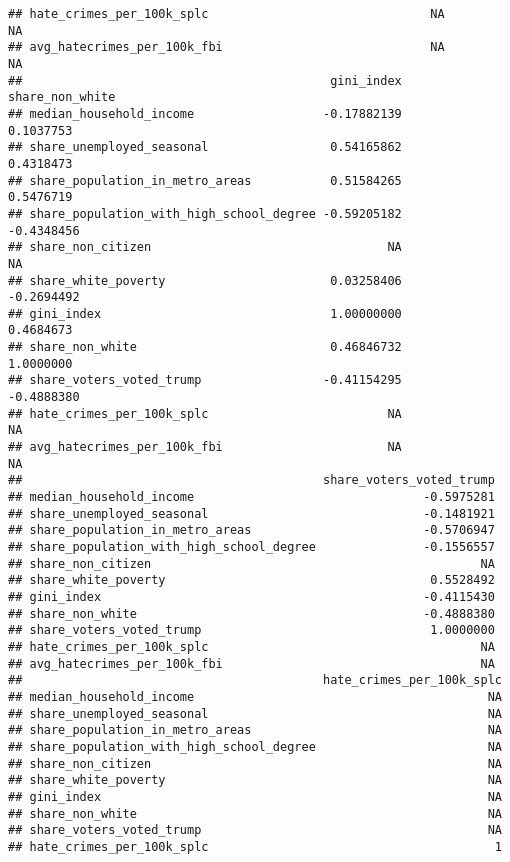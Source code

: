 \documentclass[
]{article}
\begin{document}
\begin{verbatim}
## hate_crimes_per_100k_splc                               NA                  NA
## avg_hatecrimes_per_100k_fbi                             NA                  NA
##                                           gini_index share_non_white
## median_household_income                  -0.17882139       0.1037753
## share_unemployed_seasonal                 0.54165862       0.4318473
## share_population_in_metro_areas           0.51584265       0.5476719
## share_population_with_high_school_degree -0.59205182      -0.4348456
## share_non_citizen                                 NA              NA
## share_white_poverty                       0.03258406      -0.2694492
## gini_index                                1.00000000       0.4684673
## share_non_white                           0.46846732       1.0000000
## share_voters_voted_trump                 -0.41154295      -0.4888380
## hate_crimes_per_100k_splc                         NA              NA
## avg_hatecrimes_per_100k_fbi                       NA              NA
##                                          share_voters_voted_trump
## median_household_income                                -0.5975281
## share_unemployed_seasonal                              -0.1481921
## share_population_in_metro_areas                        -0.5706947
## share_population_with_high_school_degree               -0.1556557
## share_non_citizen                                              NA
## share_white_poverty                                     0.5528492
## gini_index                                             -0.4115430
## share_non_white                                        -0.4888380
## share_voters_voted_trump                                1.0000000
## hate_crimes_per_100k_splc                                      NA
## avg_hatecrimes_per_100k_fbi                                    NA
##                                          hate_crimes_per_100k_splc
## median_household_income                                         NA
## share_unemployed_seasonal                                       NA
## share_population_in_metro_areas                                 NA
## share_population_with_high_school_degree                        NA
## share_non_citizen                                               NA
## share_white_poverty                                             NA
## gini_index                                                      NA
## share_non_white                                                 NA
## share_voters_voted_trump                                        NA
## hate_crimes_per_100k_splc                                        1

\end{verbatim}
\end{document}
